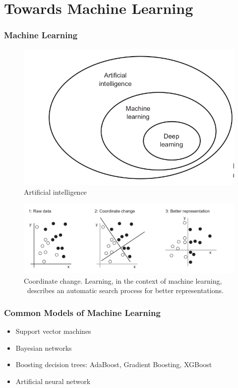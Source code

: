\documentclass{beamer}
\begin{document}
\section{Towards Machine Learning}
\begin{frame}
\frametitle{Machine Learning}

\begin{figure}
\includegraphics[scale=0.15]{./figures/Al}
\caption{Artificial intelligence}
\end{figure}

\begin{figure}
\includegraphics[scale=0.20]{./figures/rep}
\caption{Coordinate change. Learning, in the context of machine learning, \ describes an automatic search
process for better representations.}
\end{figure}
\end{frame}

\begin{frame}
\frametitle{Common Models of Machine Learning}
\begin{itemize}
\item Support vector machines
\item Bayesian networks
\item Boosting decision trees: AdaBoost, Gradient Boosting, XGBoost
\item Artificial neural network
\end{itemize}
\end{frame}
\end{document}
